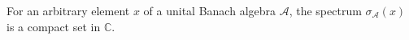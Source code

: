 For an arbitrary element $x$ of a unital Banach algebra $\mathcal{A}$, the spectrum $\sigma_{\mathcal{A}}(x)$ is a compact set in $\mathbb{C}$.
